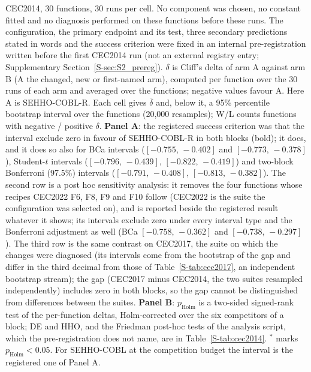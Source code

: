 \begin{table}[htbp]
\begin{flushleft}
CEC2014, 30 functions, 30 runs per cell. No component was chosen, no constant fitted and no diagnosis performed on these functions before these runs. The configuration, the primary endpoint and its test, three secondary predictions stated in words and the success criterion were fixed in an internal pre-registration written before the first CEC2014 run (not an external registry entry; Supplementary Section~\ref{S-sec:S2_prereg}). $\delta$ is Cliff's delta of arm A against arm B (A the changed, new or first-named arm), computed per function over the 30 runs of each arm and averaged over the functions; negative values favour A. Here A is SEHHO-COBL-R. Each cell gives $\bar\delta$ and, below it, a 95\% percentile bootstrap interval over the functions (20{,}000 resamples); W/L counts functions with negative / positive $\delta$. \textbf{Panel A}: the registered success criterion was that the interval exclude zero in favour of SEHHO-COBL-R in both blocks (bold); it does, and it does so also for BCa intervals ($[-0.755,\,-0.402]$ and $[-0.773,\,-0.378]$), Student-$t$ intervals ($[-0.796,\,-0.439]$, $[-0.822,\,-0.419]$) and two-block Bonferroni (97.5\%) intervals ($[-0.791,\,-0.408]$, $[-0.813,\,-0.382]$). The second row is a post hoc sensitivity analysis: it removes the four functions whose recipes CEC2022 F6, F8, F9 and F10 follow (CEC2022 is the suite the configuration was selected on), and is reported beside the registered result whatever it shows; its intervals exclude zero under every interval type and the Bonferroni adjustment as well (BCa $[-0.758,\,-0.362]$ and $[-0.738,\,-0.297]$). The third row is the same contrast on CEC2017, the suite on which the changes were diagnosed (its intervals come from the bootstrap of the gap and differ in the third decimal from those of Table~\ref{S-tab:cec2017}, an independent bootstrap stream); the gap (CEC2017 minus CEC2014, the two suites resampled independently) includes zero in both blocks, so the gap cannot be distinguished from differences between the suites. \textbf{Panel B}: $p_{\text{Holm}}$ is a two-sided signed-rank test of the per-function deltas, Holm-corrected over the six competitors of a block; DE and HHO, and the Friedman post-hoc tests of the analysis script, which the pre-registration does not name, are in Table~\ref{S-tab:cec2014}. $^{*}$ marks $p_{\text{Holm}}<0.05$. For SEHHO-COBL at the competition budget the interval is the registered one of Panel A.
\end{flushleft}
\end{table}
